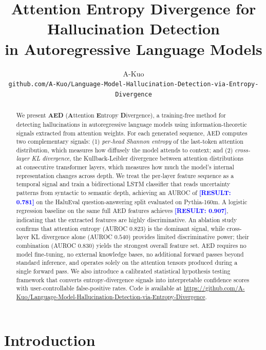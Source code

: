 \documentclass[11pt]{article}
\title{%
  Attention Entropy Divergence for Hallucination Detection\\
  in Autoregressive Language Models
}
\author{%
  A-Kuo\\
  \texttt{github.com/A-Kuo/Language-Model-Hallucination-Detection-via-Entropy-Divergence}
}
\newcommand{\RESULT}[1]{\textcolor{blue}{\textbf{[RESULT: #1]}}}
\begin{document}
\maketitle

\begin{abstract}
We present \textbf{AED} (\textbf{A}ttention \textbf{E}ntropy \textbf{D}ivergence), 
a training-free method for detecting hallucinations in autoregressive language models 
using information-theoretic signals extracted from attention weights.
%
For each generated sequence, AED computes two complementary signals: 
(1) \emph{per-head Shannon entropy} of the last-token attention distribution, 
which measures how diffusely the model attends to context; and 
(2) \emph{cross-layer KL divergence}, the Kullback-Leibler divergence between 
attention distributions at consecutive transformer layers, which measures how much 
the model's internal representation changes across depth.
%
We treat the per-layer feature sequence as a temporal signal and train a 
bidirectional LSTM classifier that reads uncertainty patterns from syntactic 
to semantic depth, achieving an AUROC of \RESULT{0.781} on the HaluEval 
question-answering split evaluated on Pythia-160m.
A logistic regression baseline on the same full AED features achieves \RESULT{0.907},
indicating that the extracted features are highly discriminative.
An ablation study confirms that attention entropy (AUROC $0.823$) is the 
dominant signal, while cross-layer KL divergence alone (AUROC $0.540$) provides 
limited discriminative power; their combination (AUROC $0.830$) yields the 
strongest overall feature set.
%
AED requires no model fine-tuning, no external knowledge bases, no additional 
forward passes beyond standard inference, and operates solely on the attention 
tensors produced during a single forward pass.
We also introduce a calibrated statistical hypothesis testing framework 
that converts entropy-divergence signals into interpretable confidence scores 
with user-controllable false-positive rates.
Code is available at 
\href{https://github.com/A-Kuo/Language-Model-Hallucination-Detection-via-Entropy-Divergence}{https://github.com/A-Kuo/Language-Model-Hallucination-Detection-via-Entropy-Divergence}.
\end{abstract}

\section{Introduction}
\end{document}
